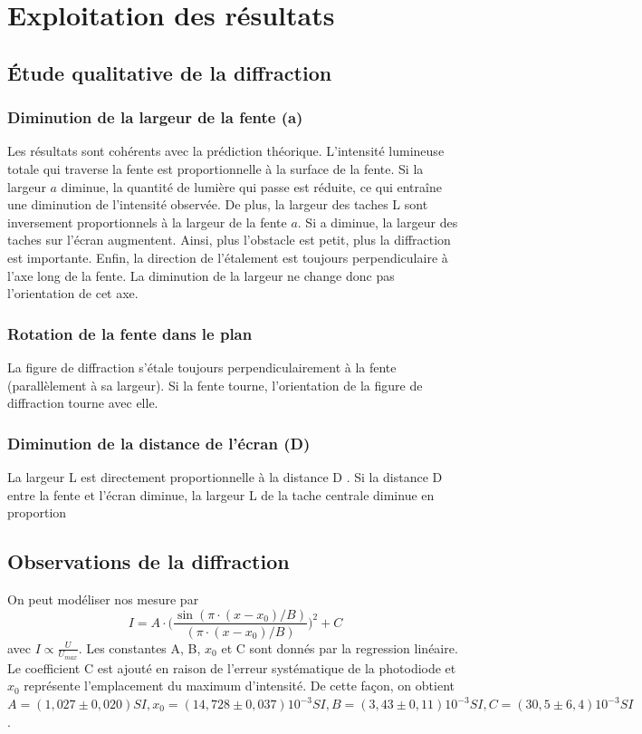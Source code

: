 \documentclass[a4paper,10pt,french]{scrartcl}
\begin{document}
\section{Exploitation des résultats}
\subsection{Étude qualitative de la diffraction}
\subsubsection{Diminution de la largeur de la fente (a)}
Les résultats sont cohérents avec la prédiction théorique.
L'intensité lumineuse totale qui traverse la fente est proportionnelle à la surface de la fente. Si la largeur $a$ diminue, la quantité de lumière qui passe est réduite, ce qui entraîne une diminution de l'intensité  observée. De plus, la largeur des taches L sont inversement proportionnels à la largeur de la fente $a$. Si a diminue, la largeur des taches sur l'écran augmentent. Ainsi, plus l'obstacle est petit, plus la diffraction est importante. Enfin, la direction de l'étalement est toujours perpendiculaire à l'axe long de la fente. La diminution de la largeur ne change donc pas l'orientation de cet axe.
\subsubsection{Rotation de la fente dans le plan}
La figure de diffraction s'étale toujours perpendiculairement à la fente (parallèlement à sa largeur). Si la fente tourne, l'orientation de la figure de diffraction tourne avec elle.
\subsubsection{Diminution de la distance de l'écran (D)}
La largeur L est directement proportionnelle à la distance D . Si la distance D entre la fente et l'écran diminue, la largeur L de la tache centrale diminue en proportion
\subsection{Observations de la diffraction}

On peut modéliser nos mesure par \[I=A\cdot\Big(\frac{\sin(\pi\cdot(x-x_0)/B)}{(\pi\cdot(x-x_0)/B)}\Big)^2+C\] avec \(I\propto \frac{U}{U_{max}}\). Les constantes A, B, \(x_0\) et C sont donnés par la regression linéaire. Le coefficient C est ajouté en raison de l'erreur systématique de la photodiode et \(x_0\) représente l'emplacement du maximum d'intensité. De cette façon, on obtient \(A=(1,027 \pm 0,020) SI, x_0=(14,728 \pm0,037)10^{-3} SI, B=(3,43 \pm0,11)10^{-3} SI, C=(30,5 \pm6,4)10^{-3} SI \).
\end{document}

